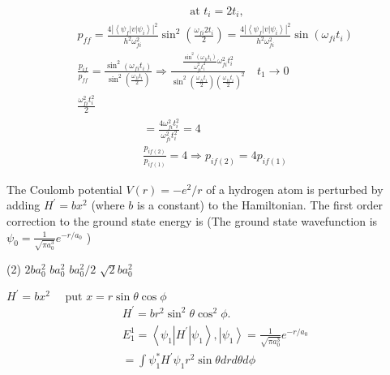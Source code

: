 \begin{enumerate}
\begin{answer}
\begin{align*}
	&\text { at } t_{i}=2 t_{i},
	\end{align*}
	\begin{align*}
	&p_{f f}=\frac{4\left|\left\langle\psi_{f}|v| \psi_{i}\right\rangle\right|^{2}}{h^{2} \omega_{f i}^{2}} \sin ^{2}\left(\frac{\omega_{f i} 2 t_{i}}{2}\right)=\frac{4\left|\left\langle\psi_{f}|v| \psi_{i}\right\rangle\right|^{2}}{h^{2} \omega_{f i}^{2}} \sin \left(\omega_{f i} t_{i}\right) \\
	&\frac{p_{i f}}{p_{f f}}=\frac{\sin ^{2}\left(\omega_{f i} t_{i}\right)}{\sin ^{2}\left(\frac{\omega_{f i} t_{i}}{2}\right)} \Rightarrow \frac{\frac{\sin ^{2}\left(\omega_{f i} t_{i}\right)}{\omega_{f i}^{2} t_{i}^{2}} \omega_{f i}^{2} t_{i}^{2}}{\sin ^{2}\left(\frac{\omega_{f i} t_{i}}{2}\right)\left(\frac{\omega_{f i} t_{i}}{2}\right)^{2}} \quad t_{1} \rightarrow 0 \\
	&\frac{\omega_{f i}^{2} t_{i}^{2}}{2}
	\end{align*}
	\begin{align*}
	&=\frac{4 \omega_{f i}^{2} t_{i}^{2}}{\omega_{f i}^{2} t_{i}^{2}}=4 \\
	&\frac{p_{i f(2)}}{p_{i f(1)}}=4 \Rightarrow p_{i f(2)}=4 p_{i f(1)}
	\end{align*}
\end{answer}
\begin{minipage}{\textwidth}
	\item The Coulomb potential $V(r)=-e^{2} / r$ of a hydrogen atom is perturbed by adding $H^{\prime}=b x^{2}$ (where $b$ is a constant) to the Hamiltonian. The first order correction to the ground state energy is
	(The ground state wavefunction is $\psi_{0}=\frac{1}{\sqrt{\pi a_{0}^{3}}} e^{-r / a_{0}}$ )
\end{minipage}
\begin{tasks}(2)
	\task[\textbf{A.}] $2 b a_{0}^{2}$
	\task[\textbf{B.}]$b a_{0}^{2}$
	\task[\textbf{C.}]$b a_{0}^{2} / 2$
	\task[\textbf{D.}]$\sqrt{2} b a_{0}^{2}$
\end{tasks}
\begin{answer}
	$H^{\prime}=b x^{2} \quad \text { put } x=r \sin \theta \cos \phi$\\
	\begin{align*}
	&H^{\prime}=b r^{2} \sin ^{2} \theta \cos ^{2} \phi . \\
	&E_{1}^{1}=\left\langle\psi_{1}\left|H^{\prime}\right| \psi_{1}\right\rangle,\left|\psi_{1}\right\rangle=\frac{1}{\sqrt{\pi a_{0}^{3}}} e^{-r / a_{0}} \\
	&=\int \psi_{1}^{*} H^{\prime} \psi_{1} r^{2} \sin \theta d r d \theta d \phi \\

\end{align*}
\end{answer}
\end{enumerate}
